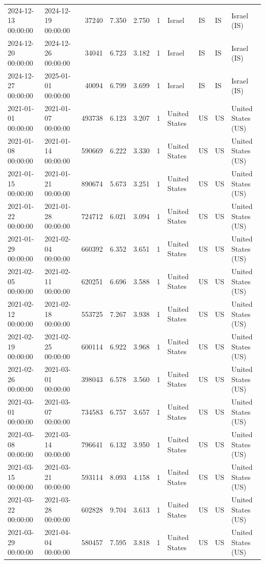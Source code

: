 \begin{tabular}{llrrrlllll}
2024-12-13 00:00:00 & 2024-12-19 00:00:00 & 37240 & 7.350 & 2.750 & 1 & Israel & IS & IS & Israel (IS) \\
2024-12-20 00:00:00 & 2024-12-26 00:00:00 & 34041 & 6.723 & 3.182 & 1 & Israel & IS & IS & Israel (IS) \\
2024-12-27 00:00:00 & 2025-01-01 00:00:00 & 40094 & 6.799 & 3.699 & 1 & Israel & IS & IS & Israel (IS) \\
2021-01-01 00:00:00 & 2021-01-07 00:00:00 & 493738 & 6.123 & 3.207 & 1 & United States & US & US & United States (US) \\
2021-01-08 00:00:00 & 2021-01-14 00:00:00 & 590669 & 6.222 & 3.330 & 1 & United States & US & US & United States (US) \\
2021-01-15 00:00:00 & 2021-01-21 00:00:00 & 890674 & 5.673 & 3.251 & 1 & United States & US & US & United States (US) \\
2021-01-22 00:00:00 & 2021-01-28 00:00:00 & 724712 & 6.021 & 3.094 & 1 & United States & US & US & United States (US) \\
2021-01-29 00:00:00 & 2021-02-04 00:00:00 & 660392 & 6.352 & 3.651 & 1 & United States & US & US & United States (US) \\
2021-02-05 00:00:00 & 2021-02-11 00:00:00 & 620251 & 6.696 & 3.588 & 1 & United States & US & US & United States (US) \\
2021-02-12 00:00:00 & 2021-02-18 00:00:00 & 553725 & 7.267 & 3.938 & 1 & United States & US & US & United States (US) \\
2021-02-19 00:00:00 & 2021-02-25 00:00:00 & 600114 & 6.922 & 3.968 & 1 & United States & US & US & United States (US) \\
2021-02-26 00:00:00 & 2021-03-01 00:00:00 & 398043 & 6.578 & 3.560 & 1 & United States & US & US & United States (US) \\
2021-03-01 00:00:00 & 2021-03-07 00:00:00 & 734583 & 6.757 & 3.657 & 1 & United States & US & US & United States (US) \\
2021-03-08 00:00:00 & 2021-03-14 00:00:00 & 796641 & 6.132 & 3.950 & 1 & United States & US & US & United States (US) \\
2021-03-15 00:00:00 & 2021-03-21 00:00:00 & 593114 & 8.093 & 4.158 & 1 & United States & US & US & United States (US) \\
2021-03-22 00:00:00 & 2021-03-28 00:00:00 & 602828 & 9.704 & 3.613 & 1 & United States & US & US & United States (US) \\
2021-03-29 00:00:00 & 2021-04-04 00:00:00 & 580457 & 7.595 & 3.818 & 1 & United States & US & US & United States (US) \\

\end{tabular}
